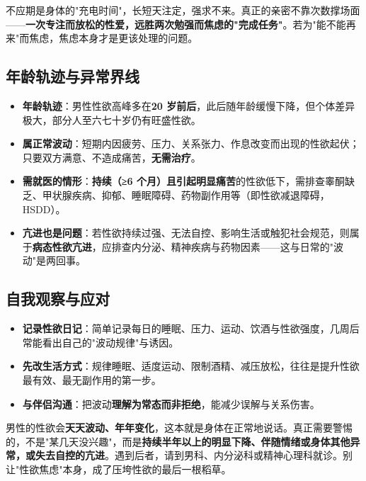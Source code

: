 \begin{tcolorbox}[colback=pink!5!white,colframe=red!50!black,title=贴心小叮咛]
不应期是身体的"充电时间"，长短天注定，强求不来。真正的亲密不靠次数撑场面——\textbf{一次专注而放松的性爱，远胜两次勉强而焦虑的"完成任务"}。若为"能不能再来"而焦虑，焦虑本身才是更该处理的问题。
\end{tcolorbox}

\subsection{年龄轨迹与异常界线}

\begin{itemize}
	\item \textbf{年龄轨迹}：男性性欲高峰多在\textbf{20 岁前后}，此后随年龄缓慢下降，但个体差异极大，部分人至六七十岁仍有旺盛性欲。
	\item \textbf{属正常波动}：短期内因疲劳、压力、关系张力、作息改变而出现的性欲起伏；只要双方满意、不造成痛苦，\textbf{无需治疗}。
	\item \textbf{需就医的情形}：\textbf{持续（≥6 个月）且引起明显痛苦}的性欲低下，需排查睾酮缺乏、甲状腺疾病、抑郁、睡眠障碍、药物副作用等（即性欲减退障碍，HSDD）。
	\item \textbf{亢进也是问题}：若性欲持续过强、无法自控、影响生活或触犯社会规范，则属于\textbf{病态性欲亢进}，应排查内分泌、精神疾病与药物因素——这与日常的"波动"是两回事。
\end{itemize}

\subsection{自我观察与应对}

\begin{itemize}
	\item \textbf{记录性欲日记}：简单记录每日的睡眠、压力、运动、饮酒与性欲强度，几周后常能看出自己的"波动规律"与诱因。
	\item \textbf{先改生活方式}：规律睡眠、适度运动、限制酒精、减压放松，往往是提升性欲最有效、最无副作用的第一步。
	\item \textbf{与伴侣沟通}：把波动\textbf{理解为常态而非拒绝}，能减少误解与关系伤害。
\end{itemize}

\begin{tcolorbox}[colback=blue!5!white,colframe=blue!50!black,title=贴心小叮咛]
男性的性欲会\textbf{天天波动、年年变化}，这本就是身体在正常地说话。真正需要警惕的，不是"某几天没兴趣"，而是\textbf{持续半年以上的明显下降、伴随情绪或身体其他异常，或失去自控的亢进}。遇到后者，请到男科、内分泌科或精神心理科就诊。别让"性欲焦虑"本身，成了压垮性欲的最后一根稻草。
\end{tcolorbox}


